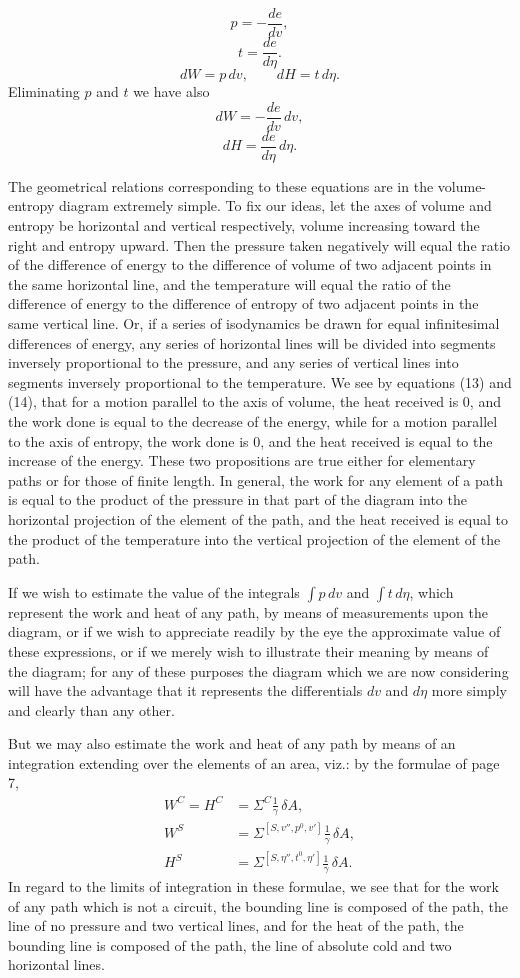 \documentclass[11pt]{article}
\begin{document}
\[
p=-\frac{de}{dv}, \tag{11}
\]
\[
t=\frac{de}{d\eta}. \tag{12}
\]
\[
dW=p\,dv,\qquad dH=t\,d\eta.
\]
Eliminating $p$ and $t$ we have also
\[
dW=-\frac{de}{dv}\,dv, \tag{13}
\]
\[
dH=\frac{de}{d\eta}\,d\eta. \tag{14}
\]

The geometrical relations corresponding to these equations are in the volume-entropy diagram extremely simple. To fix our ideas, let the axes of volume and entropy be horizontal and vertical respectively, volume increasing toward the right and entropy upward. Then the pressure taken negatively will equal the ratio of the difference of energy to the difference of volume of two adjacent points in the same horizontal line, and the temperature will equal the ratio of the difference of energy to the difference of entropy of two adjacent points in the same vertical line. Or, if a series of isodynamics be drawn for equal infinitesimal differences of energy, any series of horizontal lines will be divided into segments inversely proportional to the pressure, and any series of vertical lines into segments inversely proportional to the temperature. We see by equations (13) and (14), that for a motion parallel to the axis of volume, the heat received is 0, and the work done is equal to the decrease of the energy, while for a motion parallel to the axis of entropy, the work done is 0, and the heat received is equal to the increase of the energy. These two propositions are true either for elementary paths or for those of finite length. In general, the work for any element of a path is equal to the product of the pressure in that part of the diagram into the horizontal projection of the element of the path, and the heat received is equal to the product of the temperature into the vertical projection of the element of the path.

If we wish to estimate the value of the integrals $\int p\,dv$ and $\int t\,d\eta$, which represent the work and heat of any path, by means of measurements upon the diagram, or if we wish to appreciate readily by the eye the approximate value of these expressions, or if we merely wish to illustrate their meaning by means of the diagram; for any of these purposes the diagram which we are now considering will have the advantage that it represents the differentials $dv$ and $d\eta$ more simply and clearly than any other.

But we may also estimate the work and heat of any path by means of an integration extending over the elements of an area, viz.: by the formulae of page 7,
\begin{align*}
W^C=H^C&=\Sigma^C \frac{1}{\gamma}\,\delta A,\\
W^S&=\Sigma^{[S,v'',p^0,v']}\frac{1}{\gamma}\,\delta A,\\
H^S&=\Sigma^{[S,\eta'',t^0,\eta']}\frac{1}{\gamma}\,\delta A.
\end{align*}
In regard to the limits of integration in these formulae, we see that for the work of any path which is not a circuit, the bounding line is composed of the path, the line of no pressure and two vertical lines, and for the heat of the path, the bounding line is composed of the path, the line of absolute cold and two horizontal lines.
\end{document}
